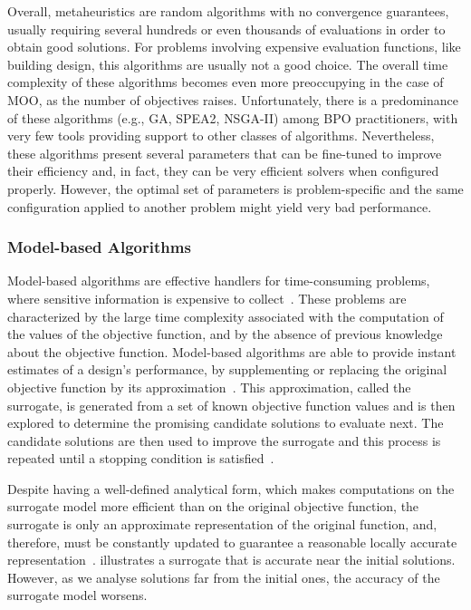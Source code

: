 	Overall, metaheuristics are random algorithms with no convergence guarantees, usually requiring several hundreds or even thousands of evaluations in order to obtain good solutions. For problems involving expensive evaluation functions, like building design, this algorithms are usually not a good choice. The overall time complexity of these algorithms becomes even more preoccupying in the case of \ac{MOO}, as the number of objectives raises.  Unfortunately, there is a predominance of these algorithms (e.g., \ac{GA}, \ac{SPEA2}, \ac{NSGA-II}) among \ac{BPO} practitioners, with very few tools providing support to other classes of algorithms. Nevertheless, these algorithms present several parameters that can be fine-tuned to improve their efficiency and, in fact, they can be very efficient solvers when configured properly. However, the optimal set of parameters is problem-specific and the same configuration applied to another problem might yield very bad performance.
	
	\subsubsection{Model-based Algorithms}
	\label{ssec:model-based}
	
	Model-based algorithms are effective handlers for time-consuming problems, where sensitive information is expensive to collect~\cite{Forrester2009SBO}. These problems are characterized by the large time complexity associated with the computation of the values of the objective function, and by the absence of previous knowledge about the objective function. Model-based algorithms are able to provide instant estimates of a design’s performance, by supplementing or replacing the original objective function by its approximation~\cite{Wortmann2016BBO}. This approximation, called the surrogate, is generated from a set of known objective function values and is then explored to determine the promising candidate solutions to evaluate next. The candidate solutions are then used to improve the surrogate and this process is repeated until a stopping condition is satisfied~\cite{Koziel2011}.
	
	Despite having a well-defined analytical form, which makes computations on the surrogate model more efficient than on the original objective function, the surrogate is only an approximate representation of the original function, and, therefore, must be constantly updated to guarantee a reasonable locally accurate representation~\cite{Koziel2011}.  illustrates a surrogate that is accurate near the initial solutions. However, as we analyse solutions far from the initial ones, the accuracy of the surrogate model worsens.
	
